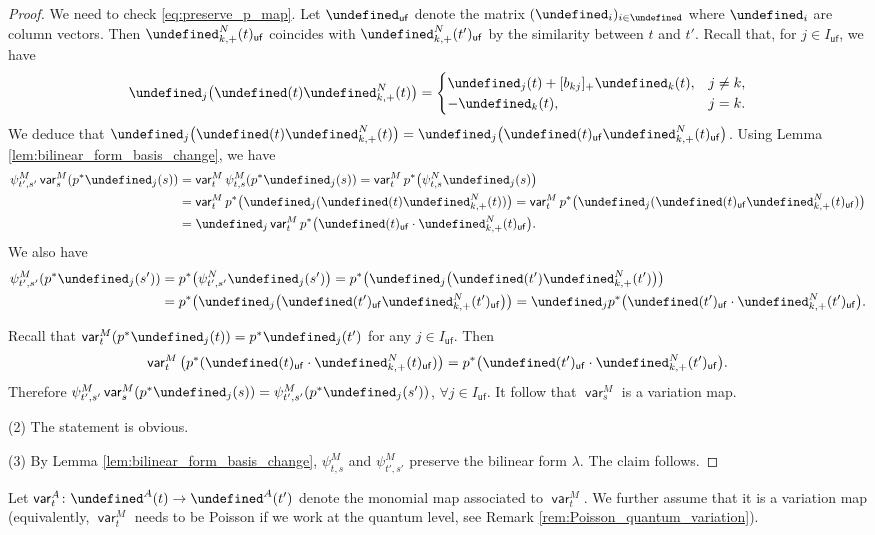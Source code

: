 \documentclass[10pt,a4paper]{amsart}
\newcommand{\opname}[1]{\operatorname{\mathsf{#1}}}
\newcommand{\var}{\opname{var}}
\newcommand{\ufv}{\opname{uf}}
\let\Iufv\undefined
\let\LP\undefined
\let\col\undefined
\let\trans\undefined
\let\ee\undefined
\let\uee\undefined
\newcommand{\Iufv}{I_{\ufv}}
\newcommand{\LP}{{\mathcal{LP}}}
\newcommand{\col}{\opname{col}}
\newcommand{\trans}{\opname{P}}
\newcommand{\ee}{\mathbf{e}}
\newcommand{\uee}{\underline{\ee}}
\numberwithin{equation}{section}
\begin{document}
\begin{proof}
We need to check \eqref{eq:preserve_p_map}. Let $\uee_{\ufv}$ denote
the matrix $(\ee_{i})_{i\in\Iufv}$ where $\ee_{i}$ are column vectors.
Then $\trans_{k,+}^{N}(t)_{\ufv}$ coincides with $\trans_{k,+}^{N}(t')_{\ufv}$
by the similarity between $t$ and $t'$. Recall that, for $j\in I_{\ufv}$, we have \[\col_{j}\big(\uee(t)\trans_{k,+}^{N}(t)\big)=\begin{cases}
 \ee_j(t)+[b_{kj}]_+\ee_k(t), & j\neq k,\\
 -\ee_k(t), & j=k.
\end{cases}\]
We deduce that $\col_{j}\big(\uee(t)\trans_{k,+}^{N}(t)\big)=\col_{j}\big(\uee(t)_{\ufv}\trans_{k,+}^{N}(t)_{\ufv}\big)$. Using Lemma \ref{lem:bilinear_form_basis_change},
we have
\begin{align*}
\psi_{t',s'}^{M}\var_{s}^{M}(p^{*}\ee_{j}(s)) & =\var_{t}^{M}\psi_{t,s}^{M}(p^{*}\ee_{j}(s))=\var_{t}^{M}p^{*}\big(\psi_{t,s}^{N}\ee_{j}(s)\big)\\
 & =\var_{t}^{M}p^{*}\bigl(\col_{j}(\uee(t)\trans_{k,+}^{N}(t))\bigr)=\var_{t}^{M}p^{*}\bigl(\col_{j}(\uee(t)_{\ufv}\trans_{k,+}^{N}(t)_{\ufv})\bigr)\\
 & =\col_{j}\var_{t}^{M}p^{*}\big(\uee(t)_{\ufv}\cdot\trans_{k,+}^{N}(t)_{\ufv}\big).
\end{align*}
We also have
\begin{align*}
\psi_{t',s'}^{M}(p^{*}\ee_{j}(s')) & =p^{*}\big(\psi_{t',s'}^{N}\ee_{j}(s')\big)=p^{*}\bigl(\col_{j}\big(\uee(t')\trans_{k,+}^{N}(t')\big)\bigr)\\
 & =p^{*}\bigl(\col_{j}\big(\uee(t')_{\ufv}\trans_{k,+}^{N}(t')_{\ufv}\big)\bigr) =\col_{j}p^{*}\big(\uee(t')_{\ufv}\cdot\trans_{k,+}^{N}(t')_{\ufv}\big).
\end{align*}

Recall that $\var_{t}^{M}(p^{*}\ee_{j}(t))=p^{*}\ee_{j}(t')$ for
any $j\in I_{\ufv}$. Then
\[\var_{t}^{M}\big(p^{*}(\uee(t)_{\ufv}\cdot\trans_{k,+}^{N}(t)_{\ufv})\big)=p^{*}\big(\uee(t')_{\ufv}\cdot\trans_{k,+}^{N}(t')_{\ufv}\big).\]
Therefore $\psi_{t',s'}^{M}\var_{s}^{M}(p^{*}\ee_{j}(s))=\psi_{t',s'}^{M}(p^{*}\ee_{j}(s'))$,
$\forall j\in I_{\ufv}$. It follow that $\var_{s}^{M}$ is a variation
map.

(2) The statement is obvious.

(3) By Lemma \ref{lem:bilinear_form_basis_change}, $\psi_{t,s}^{M}$
and $\psi_{t',s'}^{M}$ preserve the bilinear form $\lambda$. The
claim follows.
\end{proof}

Let $\var_{t}^{A}\colon\LP^{A}(t)\rightarrow \LP^{A}(t')$ denote the monomial map associated to $\var_{t}^{M}$. We further assume that it is a variation map (equivalently, $\var_t^M$ needs to be Poisson if we work at the quantum level, see Remark \ref{rem:Poisson_quantum_variation}).
\end{document}
